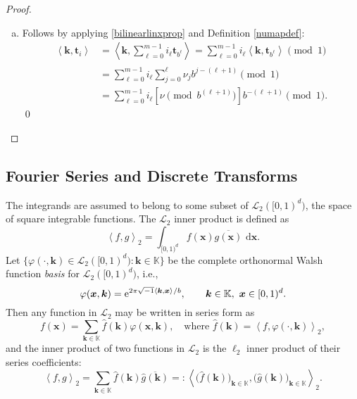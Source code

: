 \documentclass[graybox,footinfo]{svmult}
\newcommand{\dif}{\,\mathrm{d}} %
\newcommand{\vt}{\boldsymbol{t}}    %
\newcommand{\vx}{\boldsymbol{x}}    %
\newcommand{\cube}{[0,1)^d}
\newcommand{\bbK}{\mathbb{K}}
\newcommand{\ip}[3][{}]{\ensuremath{\left \langle #2, #3 \right \rangle_{#1}}}
\newcommand{\vk}{\boldsymbol{k}}    %
\newcommand{\cl}{\mathcal{L}}
\newcommand{\hf}{\hat{f}}
\newcommand{\hg}{\hat{g}}
\begin{document}
\begin{proof}
\begin{enumerate}[a)]
\item Follows by applying  \eqref{bilinearlinxprop} and Definition \ref{numapdef}:
\begin{align*}
\ip{\vk}{\vt_i} &= \ip{\vk}{\sum_{\ell=0}^{m-1} i_\ell \vt_{b^{\ell}}} = \sum_{\ell=0}^{m-1} i_\ell \ip{\vk}{\vt_{b^{\ell}}} \pmod 1 \\
& = \sum_{\ell=0}^{m-1} i_\ell \sum_{j=0}^{\ell} \nu_jb^{j-(\ell+1)} \pmod 1\\
&=\sum_{\ell=0}^{m-1} i_\ell [\nu \pmod  {b^{(\ell+1)}}]  b^{-(\ell+1)} \pmod 1.
\end{align*}\qed
\end{enumerate}
\end{proof}

\subsection{Fourier Series and Discrete Transforms}

The integrands are assumed to belong to some subset of $\cl_2(\cube)$, the space of square integrable functions.  The $\cl_2$ inner product is defined as
\[
\ip[2]{f}{g} = \int_{\cube} f(\vx) \overline{g(\vx)} \, \dif \vx.
\]
Let $\{\varphi(\cdot,\vk) \in \cl_2(\cube) : \vk \in \bbK\}$ be the complete orthonormal Walsh function \emph{basis} for $\cl_2(\cube)$, i.e.,
\[
\varphi(\vx,\vk)  = \E^{2 \pi \sqrt{-1} \ip{\vk}{\vx}/b}, \qquad \vk \in \bbK, \ \vx \in \cube.
\]
Then any function in $\cl_2$ may be written in series form as
\begin{equation} \label{Fourierdef}
f(\vx) = \sum_{\vk \in \bbK} \hf(\vk) \varphi(\vx,\vk), \quad \text{where } \hf(\vk) = \ip[2]{f}{\varphi(\cdot,\vk)},
\end{equation}
and the inner product of two functions in $\cl_2$ is the $\ell_2$ inner product of their series coefficients:
\[
\ip[2]{f}{g} = \sum_{\vk \in \bbK} \hf(\vk)\overline{\hg(\vk)} =: \ip[2]{\bigl(\hf(\vk)\bigr)_{\vk \in \bbK}}{\bigl ( \hg(\vk)\bigr )_{\vk \in \bbK}}.
\]
\end{document}
